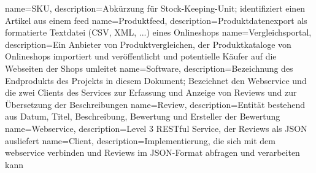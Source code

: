 {
  name=SKU,
  description={Abkürzung für Stock-Keeping-Unit; identifiziert einen Artikel aus einem \gls{feed}}
}
{
  name=Produktfeed,
  description={Produktdatenexport als formatierte Textdatei (CSV, XML, ...) eines Onlineshops}
}
{
  name=Vergleichsportal,
  description={Ein Anbieter von Produktvergleichen, der Produktkataloge von Onlineshops importiert und veröffentlicht und potentielle Käufer auf die Webseiten der Shops umleitet}
}
{
  name=Software,
  description={Bezeichnung des Endprodukts des Projekts in diesem Dokument; Bezeichnet den Webservice und die zwei Clients des Services zur Erfassung und Anzeige von Reviews und zur Übersetzung der Beschreibungen}
}
{
  name=Review,
  description={Entität bestehend aus Datum, Titel, Beschreibung, Bewertung und Ersteller der Bewertung}
}
{
  name=Webservice,
  description={Level 3 RESTful Service, der Reviews als JSON ausliefert}
}
{
  name=Client,
  description={Implementierung, die sich mit dem \gls{webservice} verbinden und Reviews im JSON-Format abfragen und verarbeiten kann}
}
